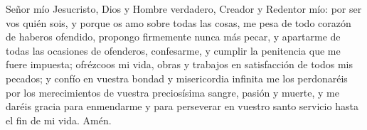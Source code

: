 \documentclass[./devocionario.tex]{subfiles}
\begin{document}
    Señor mío Jesucristo, Dios y Hombre verdadero, Creador y Redentor mío: por ser vos quién sois, y porque os amo sobre todas las cosas, 
    me pesa de todo corazón de haberos ofendido, propongo firmemente nunca más pecar, y apartarme de todas las ocasiones de ofenderos, 
    confesarme, y cumplir la penitencia que me fuere impuesta; ofrézcoos mi vida, obras y trabajos en satisfacción de todos mis pecados; 
    y confío en vuestra bondad y misericordia infinita me los perdonaréis por los merecimientos de vuestra preciosísima sangre, pasión y muerte, 
    y me daréis gracia para enmendarme y para perseverar en vuestro santo servicio hasta el fin de mi vida. Amén.
\end{document}
